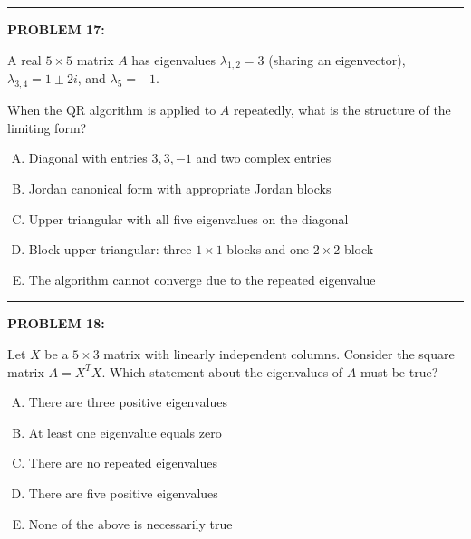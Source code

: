 \documentclass[12pt]{amsart}
\newcommand{\divider}{
  \vspace{-1em} %
  \noindent
  \raisebox{-0.15ex}{\textbullet}%
  \hspace{0.5em}%
  \rule[0.5ex]{0.95\textwidth}{1.0pt}%
  \hspace{0.5em}%
  \raisebox{-0.15ex}{\textbullet}%
  \vspace{0em} %
}
\begin{document}
\divider
\newpage 


{\bf PROBLEM 17:}

A real $5 \times 5$ matrix $A$ has eigenvalues $\lambda_{1,2} = 3$ (sharing an eigenvector), $\lambda_{3,4} = 1 \pm 2i$, and $\lambda_5 = -1$.

When the QR algorithm is applied to $A$ repeatedly, what is the structure of the limiting form?

\begin{enumerate}[(A)]
\item Diagonal with entries $3, 3, -1$ and two complex entries
\item Jordan canonical form with appropriate Jordan blocks
\item Upper triangular with all five eigenvalues on the diagonal
\item Block upper triangular: three $1 \times 1$ blocks and one $2 \times 2$ block
\item The algorithm cannot converge due to the repeated eigenvalue
\end{enumerate}


\divider


{\bf PROBLEM 18:}

Let $X$ be a $5 \times 3$ matrix with linearly independent columns. Consider the square matrix $A = X^TX$. Which statement about the eigenvalues of $A$ must be true?

\begin{enumerate}[(A)]
\item There are three positive eigenvalues
\item At least one eigenvalue equals zero
\item There are no repeated eigenvalues
\item There are five positive eigenvalues
\item None of the above is necessarily true
\end{enumerate}
\end{document}
